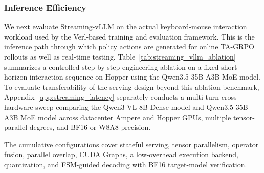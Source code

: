 \subsubsection{Inference Efficiency}

We next evaluate Streaming-vLLM on the actual keyboard-mouse interaction workload used by the Verl-based training and evaluation framework. This is the inference path through which policy actions are generated for online TA-GRPO rollouts as well as real-time testing. Table~\ref{tab:streaming_vllm_ablation} summarizes a controlled step-by-step engineering ablation on a fixed short-horizon interaction sequence on Hopper using the Qwen3.5-35B-A3B MoE model. To evaluate transferability of the serving design beyond this ablation benchmark, Appendix~\ref{app:streaming_latency} separately conducts a multi-turn cross-hardware sweep comparing the Qwen3-VL-8B Dense model and Qwen3.5-35B-A3B MoE model across datacenter Ampere and Hopper GPUs, multiple tensor-parallel degrees, and BF16 or W8A8 precision.

The cumulative configurations cover stateful serving, tensor parallelism, operator fusion, parallel overlap, CUDA Graphs, a low-overhead execution backend, quantization, and FSM-guided decoding with BF16 target-model verification.

